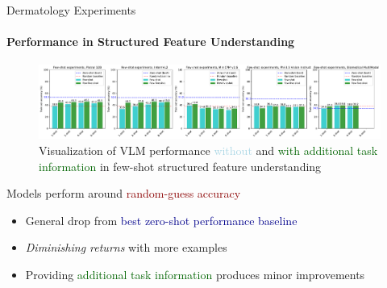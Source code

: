 \begin{frame}{Dermatology Experiments}
\framesubtitle{Performance in Structured Feature Understanding}
  \vspace{-3em}
  \begin{figure}
    \centering\hspace*{-2em}\includegraphics[width=1.1\linewidth]{figures/derm7pt_few_five_over_few_shot_structured_derm.pdf}
    \vspace{-1.6em}
    \caption{\centering Visualization of VLM performance \textcolor{lightblue}{without} and \textcolor{darkgreen}{with additional task information} in few-shot structured feature understanding}
  \end{figure}
  \vspace{-1em}
  Models perform around \textcolor{darkred}{random-guess accuracy}
  \vspace{-0.2em}
  \begin{itemize}
    \setlength{\itemsep}{0em}
    \item General drop from \textcolor{darkblue}{best zero-shot performance baseline}
    \item \emph{Diminishing returns} with more examples
    \item Providing \textcolor{darkgreen}{additional task information} produces minor improvements
  \end{itemize}
\end{frame}


